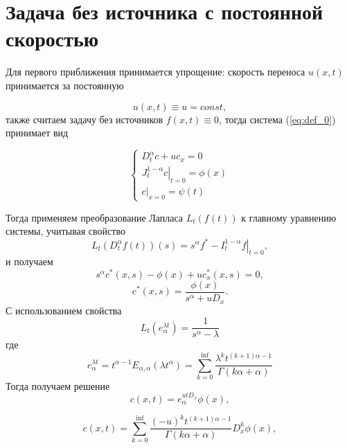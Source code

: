 \section{Задача без источника с постоянной скоростью}

Для первого приближения принимается упрощение: скорость переноса $u(x,t)$ принимается за постоянную

\begin{equation}
	u(x,t) \equiv u = const,
\end{equation}
также считаем задачу без источников $f(x,t)\equiv0$, тогда система (\ref{eq:def_0}) принимает вид

\begin{equation}
	\label{eq:an_0}
	\begin{cases}
		D^\alpha_t c + uc_x = 0\\
		\left.J^{1-\alpha}_tc\right|_{t=0} = \phi(x)\\
		\left.c\right|_{x=0}=\psi(t)
	\end{cases}
\end{equation}

Тогда применяем преобразование Лапласа $L_t(f(t))$ к главному уравнению системы, учитывая свойство
\begin{equation}
	L_t(D^\alpha_tf(t))(s) = s^\alpha f^* - \left. I^{1-\alpha}_tf \right|_{t=0},
\end{equation}
и получаем
\begin{equation}
	s^\alpha c^*(x,s) - \phi(x) + u c^*_x(x,s) = 0,
\end{equation}
\begin{equation}
	c^*(x,s) = \frac{\phi(x)}{s^\alpha + u D_x}.
\end{equation}
С использованием свойства
\begin{equation}
	L_t(e^{\lambda t}_{\alpha}) = \frac{1}{s^\alpha-\lambda}
\end{equation}
где
\begin{equation}
e^{\lambda t}_{\alpha} =
t^{\alpha - 1} E_{\alpha, \alpha}(\lambda t^{\alpha}) =
\sum_{k = 0}^{\inf}\frac{\lambda^k t^{(k+1)\alpha - 1}}{\Gamma(k\alpha + \alpha)}
\end{equation}
Тогда получаем решение
\begin{equation}
	c(x,t) = e^{utD_x}_{\alpha} \phi(x),
\end{equation}

\begin{equation}
	c(x,t) = \sum_{k = 0}^{\inf}\frac{(-u)^k t^{(k+1)\alpha - 1}}{\Gamma(k\alpha + \alpha)} D^k_x \phi(x),
\end{equation}
